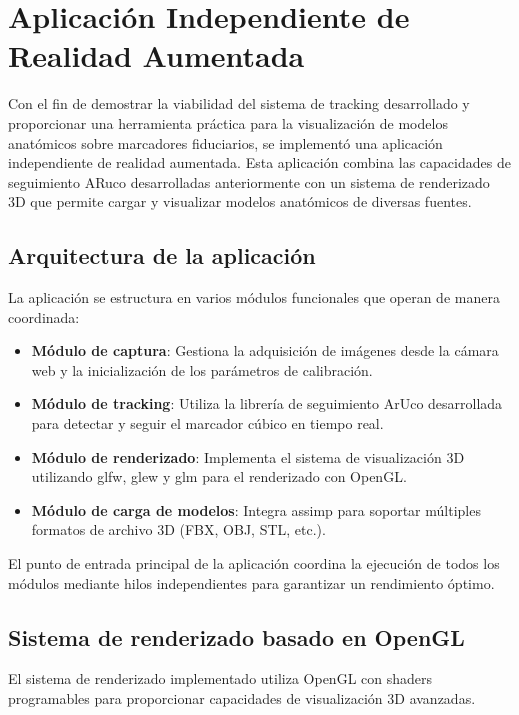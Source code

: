 \section{Aplicación Independiente de Realidad Aumentada}
\label{sec:aplicacion_independiente}

Con el fin de demostrar la viabilidad del sistema de \gls{tracking} desarrollado y proporcionar una herramienta práctica para la visualización de modelos anatómicos sobre marcadores fiduciarios, se implementó una aplicación independiente de realidad aumentada. Esta aplicación combina las capacidades de seguimiento ARuco desarrolladas anteriormente con un sistema de renderizado 3D que permite cargar y visualizar modelos anatómicos de diversas fuentes.

\subsection{Arquitectura de la aplicación}

La aplicación se estructura en varios módulos funcionales que operan de manera coordinada:

\begin{itemize}
    \item \textbf{Módulo de captura}: Gestiona la adquisición de imágenes desde la cámara web y la inicialización de los parámetros de calibración.
    \item \textbf{Módulo de tracking}: Utiliza la librería de seguimiento ArUco desarrollada para detectar y seguir el marcador cúbico en tiempo real.
    \item \textbf{Módulo de renderizado}: Implementa el sistema de visualización 3D utilizando \acrshort{glfw}, \acrshort{glew} y \acrshort{glm} para el renderizado con OpenGL.
    \item \textbf{Módulo de carga de modelos}: Integra \acrshort{assimp} para soportar múltiples formatos de archivo 3D (FBX, OBJ, STL, etc.).
\end{itemize}

El punto de entrada principal de la aplicación coordina la ejecución de todos los módulos mediante hilos independientes para garantizar un rendimiento óptimo.

\subsection{Sistema de renderizado basado en OpenGL}

El sistema de renderizado implementado utiliza OpenGL con shaders programables para proporcionar capacidades de visualización 3D avanzadas.

